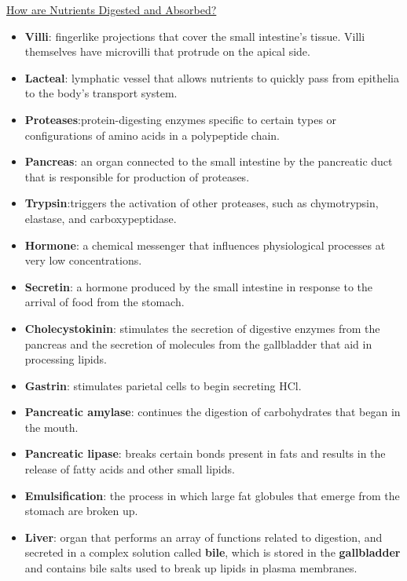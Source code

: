 \documentclass[12pt,letterpaper]{article}
\begin{document}
\begin{secbox}{\hyperlink{41}{How are Nutrients Digested and Absorbed?}}
{\begin{itemize}
        \item \textbf{Villi}: fingerlike projections that cover the small intestine's tissue. Villi themselves have microvilli that protrude on the apical side. 
        \item \textbf{Lacteal}: lymphatic vessel that allows nutrients to quickly pass from epithelia to the body's transport system.
        \item \textbf{Proteases}:protein-digesting enzymes specific to certain types or configurations of amino acids in a polypeptide chain.
        \item \textbf{Pancreas}: an organ connected to the small intestine by the pancreatic duct that is responsible for production of proteases.
        \item \textbf{Trypsin}:triggers the activation of other proteases, such as chymotrypsin, elastase, and carboxypeptidase.
        \item \textbf{Hormone}: a chemical messenger that influences physiological processes at very low concentrations.
        \item \textbf{Secretin}: a hormone produced by the small intestine in response to the arrival of food from the stomach.
        \item \textbf{Cholecystokinin}: stimulates the secretion of digestive enzymes from the pancreas and the secretion of molecules from the gallbladder that aid in processing lipids.
        \item \textbf{Gastrin}: stimulates parietal cells to begin secreting HCl.
        \item \textbf{Pancreatic amylase}: continues the digestion of carbohydrates that began in the mouth.
        \item \textbf{Pancreatic lipase}: breaks certain bonds present in fats and results in the release of fatty acids and other small lipids.
        \item \textbf{Emulsification}: the process in which large fat globules
        that emerge from the stomach are broken up.
        \item \textbf{Liver}: organ that performs an array of functions related to digestion, and secreted in a complex solution called \textbf{bile}, which is stored in the \textbf{gallbladder} and contains bile salts used to break up lipids in plasma membranes.
        \begin{center}

\end{center}
\end{itemize}}
\end{secbox}
\end{document}
